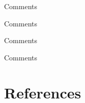 \documentclass[aspectratio=169,xcolor=dvipsnames]{beamer}
\begin{document}
\begin{frame}{Comments}


\end{frame}


\begin{frame}{Comments}


\end{frame}


\begin{frame}{Comments}


\end{frame}


\begin{frame}{Comments}


\end{frame}

 \section{References}
\end{document}
